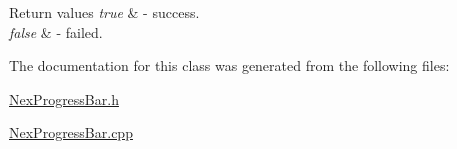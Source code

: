 \begin{DoxyRetVals}{Return values}
{\em true} & -\/ success. \\
\hline
{\em false} & -\/ failed. \\
\hline
\end{DoxyRetVals}


The documentation for this class was generated from the following files\+:\begin{DoxyCompactItemize}
\item 
\hyperlink{_nex_progress_bar_8h}{Nex\+Progress\+Bar.\+h}\item 
\hyperlink{_nex_progress_bar_8cpp}{Nex\+Progress\+Bar.\+cpp}\end{DoxyCompactItemize}
